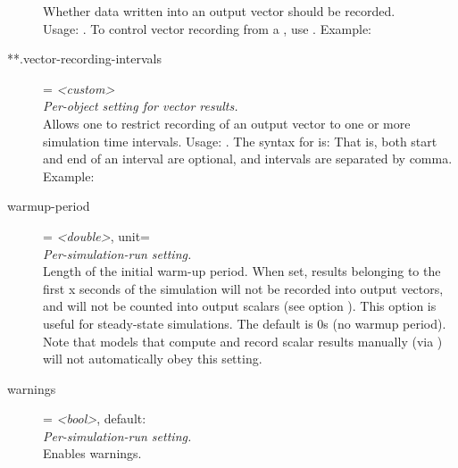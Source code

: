 \begin{description}
    Whether data written into an output vector should be recorded.\\
    Usage:
    .
    To control vector recording from a , use
    . Example:
\item[**.vector-recording-intervals] = \textit{<custom>}\\
    \textit{Per-object setting for vector results.}\\
    Allows one to restrict recording of an output vector to one or more
    simulation time intervals. Usage:
    .
    The syntax for  is:
     That is,
    both start and end of an interval are optional, and intervals are separated
    by comma.\\
    Example:
\item[warmup-period] = \textit{<double>}, unit=\\
    \textit{Per-simulation-run setting.}\\
    Length of the initial warm-up period. When set, results belonging to the
    first x seconds of the simulation will not be recorded into output vectors,
    and will not be counted into output scalars (see option
    ).
    This option is useful for steady-state simulations. The default is 0s (no
    warmup period). Note that models that compute and record scalar results
    manually (via ) will not automatically obey this
    setting.
\item[warnings] = \textit{<bool>}, default: \\
    \textit{Per-simulation-run setting.}\\
    Enables warnings.
\end{description}


